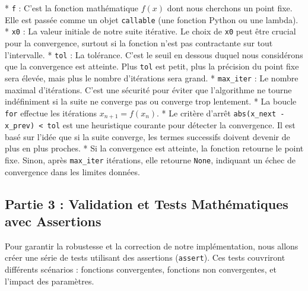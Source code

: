\documentclass[12pt,a4paper]{report}
\begin{document}
*   \texttt{f} : C'est la fonction mathématique $f(x)$ dont nous cherchons un point fixe. Elle est passée comme un objet \texttt{callable} (une fonction Python ou une lambda).
*   \texttt{x0} : La valeur initiale de notre suite itérative. Le choix de \texttt{x0} peut être crucial pour la convergence, surtout si la fonction n'est pas contractante sur tout l'intervalle.
*   \texttt{tol} : La tolérance. C'est le seuil en dessous duquel nous considérons que la convergence est atteinte. Plus \texttt{tol} est petit, plus la précision du point fixe sera élevée, mais plus le nombre d'itérations sera grand.
*   \texttt{max\_iter} : Le nombre maximal d'itérations. C'est une sécurité pour éviter que l'algorithme ne tourne indéfiniment si la suite ne converge pas ou converge trop lentement.
*   La boucle \texttt{for} effectue les itérations $x_{n+1} = f(x_n)$.
*   Le critère d'arrêt \texttt{abs(x\_next - x\_prev) < tol} est une heuristique courante pour détecter la convergence. Il est basé sur l'idée que si la suite converge, les termes successifs doivent devenir de plus en plus proches.
*   Si la convergence est atteinte, la fonction retourne le point fixe. Sinon, après \texttt{max\_iter} itérations, elle retourne \texttt{None}, indiquant un échec de convergence dans les limites données.

\subsection{Partie 3 : Validation et Tests Mathématiques avec Assertions}

Pour garantir la robustesse et la correction de notre implémentation, nous allons créer une série de tests utilisant des assertions (\texttt{assert}). Ces tests couvriront différents scénarios : fonctions convergentes, fonctions non convergentes, et l'impact des paramètres.
\end{document}
